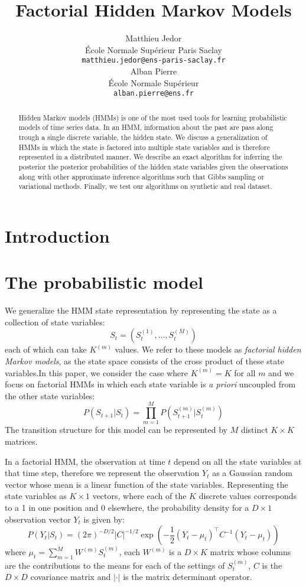 \documentclass{article}
\title{Factorial Hidden Markov Models}
\author{
  Matthieu Jedor\\
  École Normale Supérieur Paris Saclay\\
  \texttt{matthieu.jedor@ens-paris-saclay.fr} \\
   \And
   Alban Pierre \\
   École Normale Supérieur \\
   \texttt{alban.pierre@ens.fr} \\
}
\begin{document}

\maketitle

\begin{abstract}
  Hidden Markov models (HMMs) is one of the most used tools for learning probabilistic models of time series data. In an HMM, information about the past are pass along trough a single discrete variable, the hidden state. We discuss a generalization of HMMs in which the state is factored into multiple state variables and is therefore represented in a distributed manner. We describe an exact algorithm for inferring the posterior the posterior probabilities of the hidden state variables given the observations along with other approximate inference algorithms such that Gibbs sampling or variational methods. Finally, we test our algorithms on synthetic and real dataset.
\end{abstract}

\section{Introduction}

\section{The probabilistic model}
We generalize the HMM state representation by representing the state as a collection of state variables:
\[ S_t = (S_t^{(1)},\dots,S_t^{(M)}) \]
each of which can take $K^{(m)}$ values. We refer to these models as \emph{factorial hidden Markov models}, as the state space consists of the cross product of these state variables.In this paper, we consider the case where $K^{(m)} = K$ for all $m$ and we focus on factorial HMMs in which each state variable is \emph{a priori} uncoupled from the other state variables:
\begin{equation} 
P(S_{t+1}|S_t) = \prod_{m=1}^M P(S_{t+1}^{(m)}|S_t^{(m)}) 
\end{equation}
The transition structure for this model can be represented by $M$ distinct $K \times K$ matrices.

In a factorial HMM, the observation at time $t$ depend on all the state variables at that time step, therefore we represent the observation $Y_t$ as a Gaussian random vector whose mean is a linear function of the state variables. Representing the state variables as $K \times 1$ vectors, where each of the $K$ discrete values corresponds to a 1 in one position and 0 elsewhere, the probability density for a $D \times 1$ observation vector $Y_t$ is given by:
\begin{equation}
P(Y_t|S_t) = (2 \pi)^{-D/2} \left| C \right|^{-1/2} \exp \left( -\frac{1}{2} (Y_t - \mu_t)^\intercal C^{-1} (Y_t - \mu_t) \right)
\end{equation}  
where $\mu_t = \sum_{m=1}^M W^{(m)} S_t^{(m)}$, each $W^{(m)}$ is a $D \times K$ matrix whose columns are the contributions to the means for each of the settings of $S_t^{(m)}$, $C$ is the $D \times D$ covariance matrix and $\left| \cdot \right|$ is the matrix determinant operator.
\end{document}
